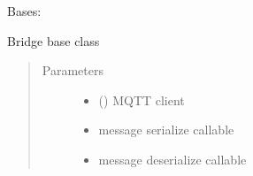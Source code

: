 \documentclass[letterpaper,10pt,english]{sphinxmanual}
\begin{document}
\begin{fulllineitems}
\label{\detokenize{source/mqtt_bridge/mqtt_bridge:mqtt_bridge.bridge.Bridge}}
Bases: 

Bridge base class
\begin{quote}\begin{description}
\item[{Parameters}] \leavevmode\begin{itemize}
\item {} 
 () \textendash{} MQTT client

\item {} 
 \textendash{} message serialize callable

\item {} 
 \textendash{} message deserialize callable

\end{itemize}

\end{description}\end{quote}

\begin{fulllineitems}
\label{\detokenize{source/mqtt_bridge/mqtt_bridge:mqtt_bridge.bridge.Bridge.is_service}}
\end{fulllineitems}


\end{fulllineitems}

\end{document}
